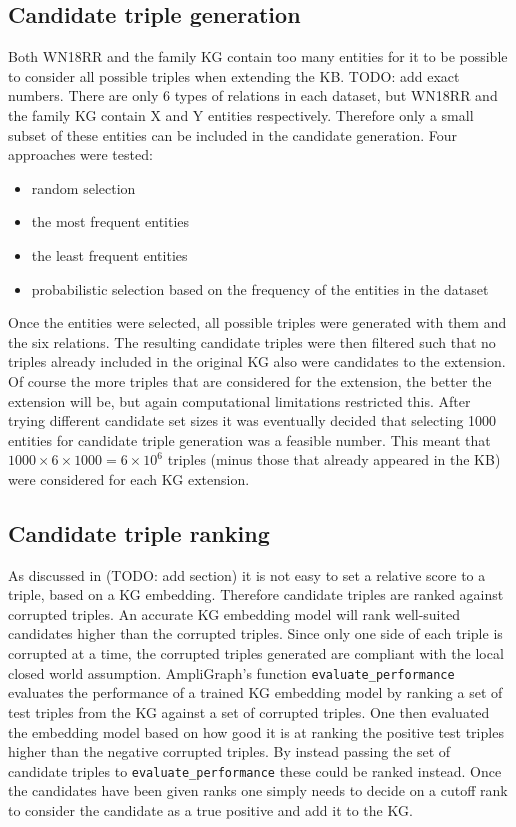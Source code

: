 \subsection{Candidate triple generation}
Both WN18RR and the family KG contain too many entities for it to be possible to consider all possible triples when extending the KB. TODO: add exact numbers. There are only 6 types of relations in each dataset, but WN18RR and the family KG contain X and Y entities respectively. Therefore only a small subset of these entities can be included in the candidate generation. Four approaches were tested:
\begin{itemize}
    \item random selection
    \item the most frequent entities
    \item the least frequent entities
    \item probabilistic selection based on the frequency of the entities in the dataset
\end{itemize}
Once the entities were selected, all possible triples were generated with them and the six relations. The resulting candidate triples were then filtered such that no triples already included in the original KG also were candidates to the extension. Of course the more triples that are considered for the extension, the better the extension will be, but again computational limitations restricted this. After trying different candidate set sizes it was eventually decided that selecting 1000 entities for candidate triple generation was a feasible number. This meant that $ 1000 \times 6 \times 1000 = 6 \times 10^6 $ triples (minus those that already appeared in the KB) were considered for each KG extension.


\subsection{Candidate triple ranking}
As discussed in (TODO: add section) it is not easy to set a relative score to a triple, based on a KG embedding. Therefore candidate triples are ranked against corrupted triples. An accurate KG embedding model will rank well-suited candidates higher than the corrupted triples. Since only one side of each triple is corrupted at a time, the corrupted triples generated are compliant with the local closed world assumption. AmpliGraph's function \texttt{evaluate\_performance} evaluates the performance of a trained KG embedding model by ranking a set of test triples from the KG against a set of corrupted triples. One then evaluated the embedding model based on how good it is at ranking the positive test triples higher than the negative corrupted triples. By instead passing the set of candidate triples to \texttt{evaluate\_performance} these could be ranked instead. Once the candidates have been given ranks one simply needs to decide on a cutoff rank to consider the candidate as a true positive and add it to the KG.


